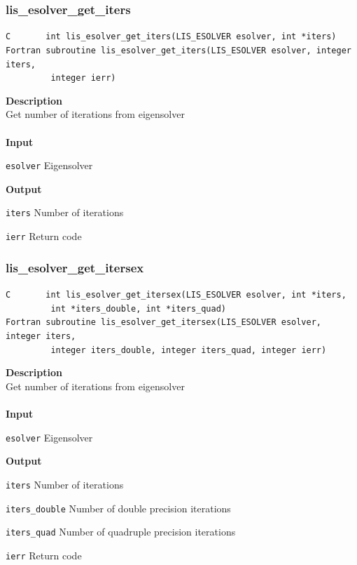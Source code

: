 \documentclass[a4paper]{article}
\newcommand{\namelistlabel}[1]{\mbox{#1}\hfill}
\newenvironment{namelist}[1]{%
 \begin{list}{}
  {\let\makelabel\namelistlabel
  \settowidth{\labelwidth}{#1}
  \setlength{\leftmargin}{1.1\labelwidth}}
}{%
\end{list}}
\begin{document}
  \subsubsection{lis\_esolver\_get\_iters}
\begin{screen}
\verb|C       int lis_esolver_get_iters(LIS_ESOLVER esolver, int *iters)|\\
\verb|Fortran subroutine lis_esolver_get_iters(LIS_ESOLVER esolver, integer iters,|\\
\verb|         integer ierr)|
\end{screen}
{\bf Description}\\
\indent
Get number of iterations from eigensolver
\\ \\
\noindent
{\bf Input}
\begin{namelist}{XXXXXXXXXXXXXXXXXXXX}
\item[\tt esolver] Eigensolver
\end{namelist}
{\bf Output}
\begin{namelist}{XXXXXXXXXXXXXXXXXXXX}
\item[\tt iters] Number of iterations
\item[\tt ierr] Return code
\end{namelist}
\newpage
  \subsubsection{lis\_esolver\_get\_itersex}
\begin{screen}
\verb|C       int lis_esolver_get_itersex(LIS_ESOLVER esolver, int *iters,|\\
\verb|         int *iters_double, int *iters_quad)|\\
\verb|Fortran subroutine lis_esolver_get_itersex(LIS_ESOLVER esolver, integer iters,|\\
\verb|         integer iters_double, integer iters_quad, integer ierr)|
\end{screen}
{\bf Description}\\
\indent
Get number of iterations from eigensolver
\\ \\
\noindent
{\bf Input}
\begin{namelist}{XXXXXXXXXXXXXXXXXXXX}
\item[\tt esolver] Eigensolver
\end{namelist}
{\bf Output}
\begin{namelist}{XXXXXXXXXXXXXXXXXXXX}
\item[\tt iters] Number of iterations
\item[\tt iters\_double] Number of double precision iterations
\item[\tt iters\_quad] Number of quadruple precision iterations
\item[\tt ierr] Return code
\end{namelist}
\end{document}
